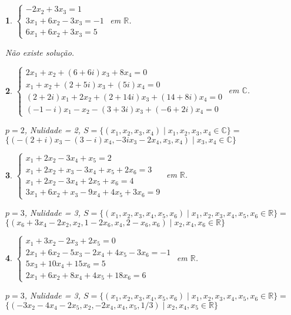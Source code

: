 \documentclass[12pt]{exam}
\newtheorem{exercicio}{}
\newcommand{\real}{\mathbb{R}}
\newcommand{\complex}{\mathbb{C}}
\begin{document}
\begin{exercicio}
  $\begin{cases}
    -2x_2 + 3x_3 = 1\\
    3x_1 + 6x_2 - 3x_3 = -1\\
    6x_1 + 6x_2 + 3x_3 = 5
  \end{cases}$ em $\real$.
  \begin{solucao}
    N\~ao existe solu\c{c}\~ao.
  \end{solucao}
\end{exercicio}

\begin{exercicio}
  $\begin{cases}
    2x_1 + x_2 + (6 + 6i)x_3 + 8x_4 = 0\\
    x_1 + x_2 + (2 + 5i)x_3 + (5  i)x_4 = 0\\
    (2 + 2i)x_1 + 2x_2 + (2 + 14i)x_3 + (14 + 8i)x_4 =0\\
    (-1 - i)x_1 - x_2 - (3 + 3i)x_3 + (-6 + 2i)x_4 = 0
  \end{cases}$ em $\complex$.
  \begin{solucao}
    $p = 2$, Nulidade = 2, $S = \{(x_1, x_2, x_3, x_4) \mid x_1, x_2, x_3, x_4 \in \complex\} = $\\ $\{(-(2 + i)x_3 - (3 - i)x_4,-3ix_3 - 2x_4, x_3, x_4) \mid x_3, x_4 \in \complex\}$
  \end{solucao}
\end{exercicio}

\begin{exercicio}
  $\begin{cases}
    x_1 + 2x_2 - 3x_4 + x_5 = 2\\
    x_1 + 2x_2 + x_3 - 3x_4 + x_5 + 2x_6 = 3\\
    x_1 + 2x_2 - 3x_4 + 2x_5 + x_6 = 4\\
    3x_1 + 6x_2 + x_3 - 9x_4 + 4x_5 + 3x_6 = 9
  \end{cases}$ em $\real$.
  \begin{solucao}
    $p = 3$, Nulidade = 3, $S = \{(x_1, x_2, x_3, x_4, x_5, x_6) \mid x_1, x_2, x_3, x_4, x_5, x_6 \in \real\} = $\\ $\{(x_6 + 3x_4 - 2x_2, x_2, 1 - 2x_6, x_4, 2 - x_6, x_6) \mid x_2, x_4, x_6 \in \real\}$
  \end{solucao}
\end{exercicio}

\begin{exercicio}
  $\begin{cases}
    x_1 + 3x_2 - 2x_3 + 2x_5 = 0\\
    2x_1 + 6x_2 - 5x_3 - 2x_4 + 4x_5 - 3x_6 = -1\\
    5x_3 + 10x_4 + 15x_6 = 5\\
    2x_1 + 6x_2 + 8x_4 + 4x_5 + 18x_6 = 6
  \end{cases}$ em $\real$.
  \begin{solucao}
    $p = 3$, Nulidade = 3, $S = \{(x_1, x_2, x_3, x_4, x_5, x_6) \mid x_1, x_2, x_3, x_4, x_5, x_6 \in \real\} = $\\ $\{(-3x_2 - 4x_4 - 2x_5, x_2, -2x_4, x_4, x_5, 1/3) \mid x_2, x_4, x_5 \in \real\}$
  \end{solucao}
\end{exercicio}
\end{document}
